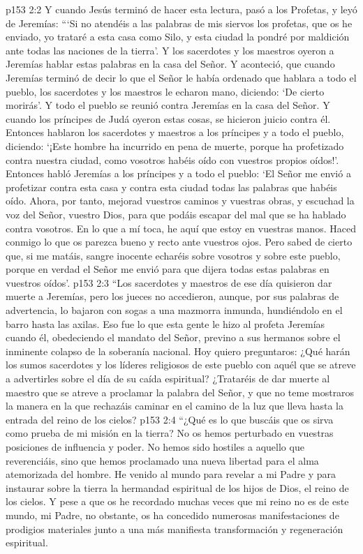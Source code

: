 \vs p153 2:2 Y cuando Jesús terminó de hacer esta lectura, pasó a los Profetas, y leyó de Jeremías: “‘Si no atendéis a las palabras de mis siervos los profetas, que os he enviado, yo trataré a esta casa como Silo, y esta ciudad la pondré por maldición ante todas las naciones de la tierra’. Y los sacerdotes y los maestros oyeron a Jeremías hablar estas palabras en la casa del Señor. Y aconteció, que cuando Jeremías terminó de decir lo que el Señor le había ordenado que hablara a todo el pueblo, los sacerdotes y los maestros le echaron mano, diciendo: ‘De cierto morirás’. Y todo el pueblo se reunió contra Jeremías en la casa del Señor. Y cuando los príncipes de Judá oyeron estas cosas, se hicieron juicio contra él. Entonces hablaron los sacerdotes y maestros a los príncipes y a todo el pueblo, diciendo: ‘¡Este hombre ha incurrido en pena de muerte, porque ha profetizado contra nuestra ciudad, como vosotros habéis oído con vuestros propios oídos!’. Entonces habló Jeremías a los príncipes y a todo el pueblo: ‘El Señor me envió a profetizar contra esta casa y contra esta ciudad todas las palabras que habéis oído. Ahora, por tanto, mejorad vuestros caminos y vuestras obras, y escuchad la voz del Señor, vuestro Dios, para que podáis escapar del mal que se ha hablado contra vosotros. En lo que a mí toca, he aquí que estoy en vuestras manos. Haced conmigo lo que os parezca bueno y recto ante vuestros ojos. Pero sabed de cierto que, si me matáis, sangre inocente echaréis sobre vosotros y sobre este pueblo, porque en verdad el Señor me envió para que dijera todas estas palabras en vuestros oídos’.
\vs p153 2:3 “Los sacerdotes y maestros de ese día quisieron dar muerte a Jeremías, pero los jueces no accedieron, aunque, por sus palabras de advertencia, lo bajaron con sogas a una mazmorra inmunda, hundiéndolo en el barro hasta las axilas. Eso fue lo que esta gente le hizo al profeta Jeremías cuando él, obedeciendo el mandato del Señor, previno a sus hermanos sobre el inminente colapso de la soberanía nacional. Hoy quiero preguntaros: ¿Qué harán los sumos sacerdotes y los líderes religiosos de este pueblo con aquél que se atreve a advertirles sobre el día de su caída espiritual? ¿Trataréis de dar muerte al maestro que se atreve a proclamar la palabra del Señor, y que no teme mostraros la manera en la que rechazáis caminar en el camino de la luz que lleva hasta la entrada del reino de los cielos?
\vs p153 2:4 “¿Qué es lo que buscáis que os sirva como prueba de mi misión en la tierra? No os hemos perturbado en vuestras posiciones de influencia y poder. No hemos sido hostiles a aquello que reverenciáis, sino que hemos proclamado una nueva libertad para el alma atemorizada del hombre. He venido al mundo para revelar a mi Padre y para instaurar sobre la tierra la hermandad espiritual de los hijos de Dios, el reino de los cielos. Y pese a que os he recordado muchas veces que mi reino no es de este mundo, mi Padre, no obstante, os ha concedido numerosas manifestaciones de prodigios materiales junto a una más manifiesta transformación y regeneración espiritual.

